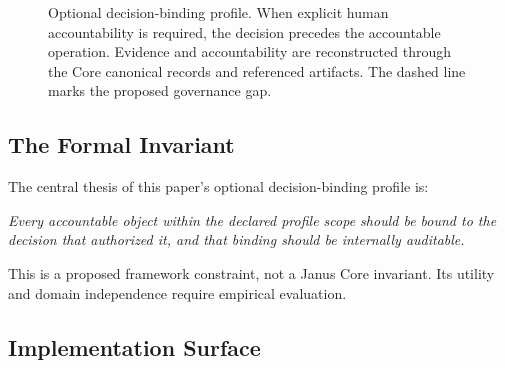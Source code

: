 \documentclass[conference]{IEEEtran}
\begin{document}
\begin{figure}[t]
\centering
{}
\caption{Optional decision-binding profile. When explicit human accountability is required, the decision precedes the accountable operation. Evidence and accountability are reconstructed through the Core canonical records and referenced artifacts. The dashed line marks the proposed governance gap.}
\label{fig:kernel}
\end{figure}

\subsection{The Formal Invariant}

The central thesis of this paper's optional decision-binding profile is:

\medskip
\noindent\emph{Every accountable object within the declared profile scope should
be bound to the decision that authorized it, and that binding should be
internally auditable.}

\medskip
This is a proposed framework constraint, not a Janus Core invariant. Its utility
and domain independence require empirical evaluation.

\subsection{Implementation Surface}
\end{document}
